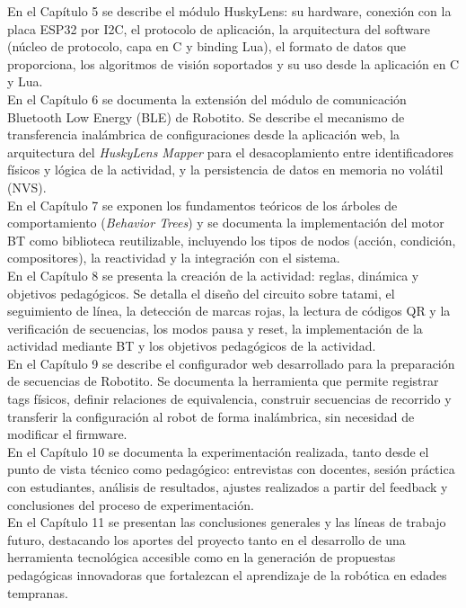 \documentclass{prgrado}
\begin{document}
En el Capítulo 5 se describe el módulo HuskyLens: su hardware, conexión con la placa ESP32 por I2C, el protocolo de aplicación, la arquitectura del software (núcleo de protocolo, capa en C y binding Lua), el formato de datos que proporciona, los algoritmos de visión soportados y su uso desde la aplicación en C y Lua. \\

En el Capítulo 6 se documenta la extensión del módulo de comunicación Bluetooth Low Energy (BLE) de Robotito. Se describe el mecanismo de transferencia inalámbrica de configuraciones desde la aplicación web, la arquitectura del \textit{HuskyLens Mapper} para el desacoplamiento entre identificadores físicos y lógica de la actividad, y la persistencia de datos en memoria no volátil (NVS). \\

En el Capítulo 7 se exponen los fundamentos teóricos de los árboles de comportamiento (\textit{Behavior Trees}) y se documenta la implementación del motor BT como biblioteca reutilizable, incluyendo los tipos de nodos (acción, condición, compositores), la reactividad y la integración con el sistema. \\

En el Capítulo 8 se presenta la creación de la actividad: reglas, dinámica y objetivos pedagógicos. Se detalla el diseño del circuito sobre tatami, el seguimiento de línea, la detección de marcas rojas, la lectura de códigos QR y la verificación de secuencias, los modos pausa y reset, la implementación de la actividad mediante BT y los objetivos pedagógicos de la actividad. \\

En el Capítulo 9 se describe el configurador web desarrollado para la preparación de secuencias de Robotito. Se documenta la herramienta que permite registrar tags físicos, definir relaciones de equivalencia, construir secuencias de recorrido y transferir la configuración al robot de forma inalámbrica, sin necesidad de modificar el firmware. \\


En el Capítulo 10 se documenta la experimentación realizada, tanto desde el punto de vista técnico como pedagógico: entrevistas con docentes, sesión práctica con estudiantes, análisis de resultados, ajustes realizados a partir del feedback y conclusiones del proceso de experimentación. \\

En el Capítulo 11 se presentan las conclusiones generales y las líneas de trabajo futuro, destacando los aportes del proyecto tanto en el desarrollo de una herramienta tecnológica accesible como en la generación de propuestas pedagógicas innovadoras que fortalezcan el aprendizaje de la robótica en edades tempranas. \\
\end{document}
